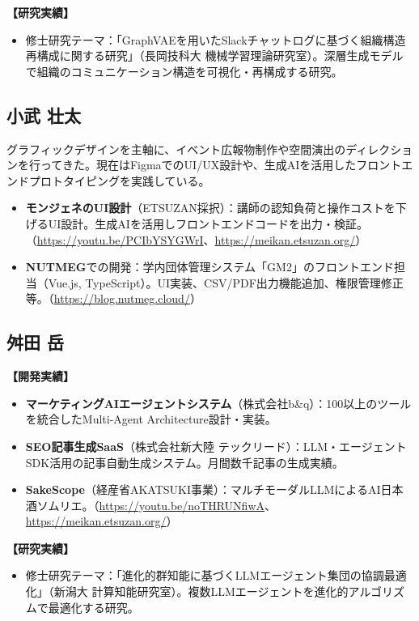 \documentclass[paper=a4,fontsize=10.5bp,jafontsize=10.5bp,twocolumn]{jlreq}
\begin{document}
\textbf{【研究実績】}
\begin{itemize}
  \item 修士研究テーマ：「GraphVAEを用いたSlackチャットログに基づく組織構造再構成に関する研究」（長岡技科大 機械学習理論研究室）。深層生成モデルで組織のコミュニケーション構造を可視化・再構成する研究。
\end{itemize}

\subsection*{小武 壮太}

グラフィックデザインを主軸に、イベント広報物制作や空間演出のディレクションを行ってきた。現在はFigmaでのUI/UX設計や、生成AIを活用したフロントエンドプロトタイピングを実践している。

\begin{itemize}
  \item \textbf{モンジェネのUI設計}（ETSUZAN採択）：講師の認知負荷と操作コストを下げるUI設計。生成AIを活用しフロントエンドコードを出力・検証。（\url{https://youtu.be/PCIbYSYGWrI}、\url{https://meikan.etsuzan.org/}）
  \item \textbf{NUTMEG}での開発：学内団体管理システム「GM2」のフロントエンド担当（Vue.js, TypeScript）。UI実装、CSV/PDF出力機能追加、権限管理修正等。（\url{https://blog.nutmeg.cloud/}）
\end{itemize}

\subsection*{舛田 岳}

\textbf{【開発実績】}
\begin{itemize}
  \item \textbf{マーケティングAIエージェントシステム}（株式会社b\&q）：100以上のツールを統合したMulti-Agent Architecture設計・実装。
  \item \textbf{SEO記事生成SaaS}（株式会社新大陸 テックリード）：LLM・エージェントSDK活用の記事自動生成システム。月間数千記事の生成実績。
  \item \textbf{SakeScope}（経産省AKATSUKI事業）：マルチモーダルLLMによるAI日本酒ソムリエ。（\url{https://youtu.be/noTHRUNfiwA}、\url{https://meikan.etsuzan.org/}）
\end{itemize}

\textbf{【研究実績】}
\begin{itemize}
  \item 修士研究テーマ：「進化的群知能に基づくLLMエージェント集団の協調最適化」（新潟大 計算知能研究室）。複数LLMエージェントを進化的アルゴリズムで最適化する研究。
\end{itemize}
\end{document}
